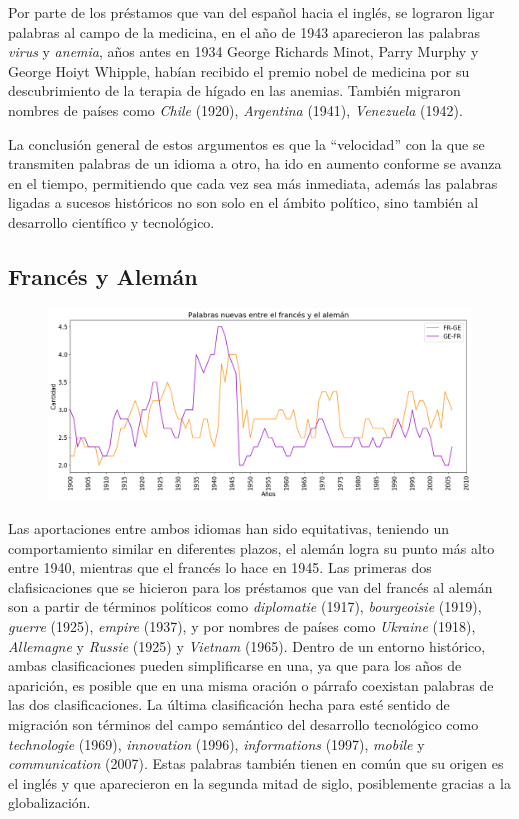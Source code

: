 Por parte de los préstamos que van del español hacia el inglés,  se lograron ligar palabras al campo de la medicina,  en el año de 1943 aparecieron las palabras \textit{virus} y \textit{anemia}, años antes en 1934 George Richards Minot, Parry Murphy y George Hoiyt Whipple, habían recibido el premio nobel de medicina por su descubrimiento de la terapia de hígado en las anemias.  También migraron nombres de países como \textit{Chile} (1920), \textit{Argentina} (1941),  \textit{Venezuela} (1942).

La conclusión general  de estos argumentos es que la “velocidad” con la que se transmiten palabras de un idioma a otro,  ha ido en aumento conforme se avanza en el tiempo, permitiendo que cada vez sea más inmediata, además las palabras ligadas a sucesos históricos no son solo en el ámbito político, sino también al desarrollo científico y tecnológico. 


\hfill\break

\subsection{Francés y Alemán}

\begin{figure}[h!]
	\centering
	\includegraphics[scale=.38]{Cap_2/NC_2_S2_FR.png}
	\label{NC_FG}
	\caption{}
\end{figure}


Las aportaciones entre ambos idiomas han sido equitativas,  teniendo un comportamiento similar en diferentes plazos, el alemán logra su punto más alto entre 1940, mientras que el francés lo hace  en 1945.  Las primeras dos clafisicaciones que se hicieron para los préstamos que van del francés al alemán son a partir de términos políticos como \textit{diplomatie} (1917), \textit{bourgeoisie} (1919),  \textit{guerre} (1925),  \textit{empire} (1937), y por nombres de  países como \textit{Ukraine} (1918),  \textit{Allemagne} y \textit{Russie} (1925) y \textit{Vietnam} (1965).  Dentro de un entorno histórico,  ambas clasificaciones pueden simplificarse en una, ya que para los años de aparición, es posible que en una misma oración o párrafo coexistan palabras de las dos clasificaciones.  La última clasificación hecha para esté sentido de migración son términos del campo semántico del desarrollo tecnológico como \textit{technologie} (1969),  \textit{innovation} (1996), \textit{informations} (1997),  \textit{mobile} y \textit{communication} (2007).  Estas palabras también tienen en común que su origen es el inglés y que aparecieron en la segunda mitad de siglo, posiblemente gracias a la globalización. 

